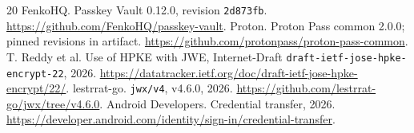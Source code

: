 \documentclass[letterpaper,twocolumn,10pt]{article}
\begin{document}
\begin{thebibliography}{20}
 FenkoHQ. Passkey Vault 0.12.0, revision \texttt{2d873fb}. \url{https://github.com/FenkoHQ/passkey-vault}.
 Proton. Proton Pass common 2.0.0; pinned revisions in artifact. \url{https://github.com/protonpass/proton-pass-common}.
 T. Reddy et al. Use of HPKE with JWE, Internet-Draft \texttt{draft-ietf-jose-hpke-encrypt-22}, 2026. \url{https://datatracker.ietf.org/doc/draft-ietf-jose-hpke-encrypt/22/}.
 lestrrat-go. \texttt{jwx/v4}, v4.6.0, 2026. \url{https://github.com/lestrrat-go/jwx/tree/v4.6.0}.
 Android Developers. Credential transfer, 2026. \url{https://developer.android.com/identity/sign-in/credential-transfer}.
\end{thebibliography}
\end{document}
